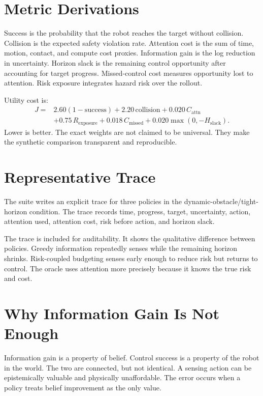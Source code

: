\documentclass{article}
\begin{document}
\section{Metric Derivations}

Success is the probability that the robot reaches the target without collision.
Collision is the expected safety violation rate. Attention cost is the sum of
time, motion, contact, and compute cost proxies. Information gain is the log
reduction in uncertainty. Horizon slack is the remaining control opportunity
after accounting for target progress. Missed-control cost measures opportunity
lost to attention. Risk exposure integrates hazard risk over the rollout.

Utility cost is:
\[
\begin{aligned}
J ={}&
2.60(1-\mathrm{success})
+ 2.20\,\mathrm{collision}
+ 0.020\,C_{\mathrm{attn}} \\
&+ 0.75\,R_{\mathrm{exposure}}
+ 0.018\,C_{\mathrm{missed}}
+ 0.020\max(0,-H_{\mathrm{slack}}).
\end{aligned}
\]
Lower is better. The exact weights are not claimed to be universal. They make
the synthetic comparison transparent and reproducible.

\section{Representative Trace}

The suite writes an explicit trace for three policies in the
dynamic-obstacle/tight-horizon condition. The trace records time, progress,
target, uncertainty, action, attention used, attention cost, risk before
action, and horizon slack.

The trace is included for auditability. It shows the qualitative difference
between policies. Greedy information repeatedly senses while the remaining
horizon shrinks. Risk-coupled budgeting senses early enough to reduce risk but
returns to control. The oracle uses attention more precisely because it knows
the true risk and cost.

\section{Why Information Gain Is Not Enough}

Information gain is a property of belief. Control success is a property of the
robot in the world. The two are connected, but not identical. A sensing action
can be epistemically valuable and physically unaffordable. The error occurs
when a policy treats belief improvement as the only value.
\end{document}
